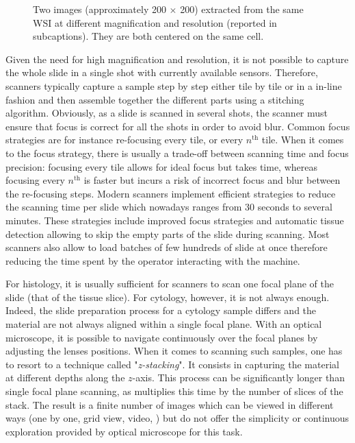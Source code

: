 \begin{figure}
  \centering
  \hspace{0.5cm}
  \caption{Two images (approximately 200 $\times$ 200) extracted from the same WSI at different magnification and resolution (reported in subcaptions). They are both centered on the same cell.}
\end{figure}

Given the need for high magnification and resolution, it is not possible to capture the whole slide in a single shot with currently available sensors. Therefore, scanners typically capture a sample step by step either tile by tile or in a in-line fashion and then assemble together the different parts using a stitching algorithm. Obviously, as a slide is scanned in several shots, the scanner must ensure that focus is correct for all the shots in order to avoid blur. Common focus strategies are for instance re-focusing every tile, or every $n^{\text{th}}$ tile. When it comes to the focus strategy, there is usually a trade-off between scanning time and focus precision: focusing every tile allows for ideal focus but takes time, whereas focusing every $n^{\text{th}}$ is faster but incurs a risk of incorrect focus and blur between the re-focusing steps. Modern scanners implement efficient strategies to reduce the scanning time per slide which nowadays ranges from 30 seconds to several minutes. These strategies include improved focus strategies and automatic tissue detection allowing to skip the empty parts of the slide during scanning. Most scanners also allow to load batches of few hundreds of slide at once therefore reducing the time spent by the operator interacting with the machine.

For histology, it is usually sufficient for scanners to scan one focal plane of the slide (\ie that of the tissue slice). For cytology, however, it is not always enough. Indeed, the slide preparation process for a cytology sample differs and the material are not always aligned within a single focal plane. With an optical microscope, it is possible to navigate continuously over the focal planes by adjusting the lenses positions. When it comes to scanning such samples, one has to resort to a technique called "\textit{z-stacking}". It consists in capturing the material at different depths along the $z$-axis. This process can be significantly longer than single focal plane scanning, as multiplies this time by the number of slices of the stack. The result is a finite number of images which can be viewed in different ways (\eg one by one, grid view, video, \etc) but do not offer the simplicity or continuous exploration provided by optical microscope for this task. 

